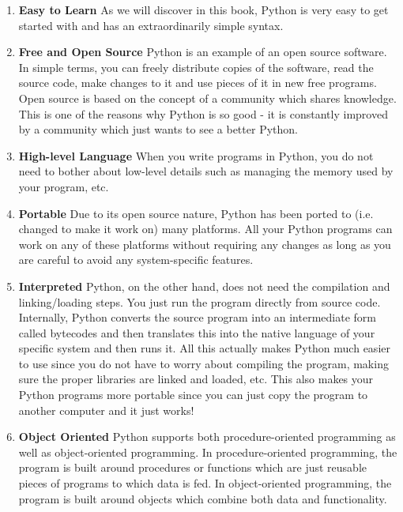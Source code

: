 \begin{enumerate}[1. ]
\item \textbf{Easy to Learn} \newline As we will discover in this book, Python is very easy to get started with and has an extraordinarily simple syntax.
\item \textbf{Free and Open Source} \newline Python is an example of an open source software. In simple terms, you can freely distribute copies of the software, read the source code, make changes to it and use pieces of it in new free programs. Open source is based on the concept of a community which shares knowledge. This is one of the reasons why Python is so good - it is constantly improved by a community which just wants to see a better Python.
\item \textbf{High-level Language} \newline When you write programs in Python, you do not need to bother about low-level details such as managing the memory used by your program, etc.
\item \textbf{Portable} \newline Due to its open source nature, Python has been ported to (i.e. changed to make it work on) many platforms. All your Python programs can work on any of these platforms without requiring any changes as long as you are careful to avoid any system-specific features.
\item \textbf{Interpreted} \newline Python, on the other hand, does not need the compilation and linking/loading steps. You just run the program directly from source code. Internally, Python converts the source program into an intermediate form called bytecodes and then translates this into the native language of your specific system and then runs it. All this actually makes Python much easier to use since you do not have to worry about compiling the program, making sure the proper libraries are linked and loaded, etc. This also makes your Python programs more portable since you can just copy the program to another computer and it just works!
\item \textbf{Object Oriented} \newline Python supports both procedure-oriented programming as well as object-oriented programming. In procedure-oriented programming, the program is built around procedures or functions which are just reusable pieces of programs to which data is fed. In object-oriented programming, the program is built around objects which combine both data and functionality.



\end{enumerate}
